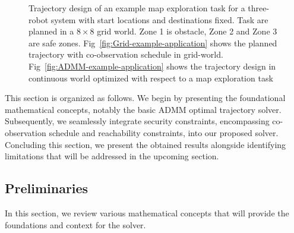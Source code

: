 \documentclass[journal]{IEEEtran}  %
\begin{document}
\begin{figure}
     \centering
     \caption{Trajectory design of an example map exploration task for a three-robot system with start locations and destinations fixed. Task are planned in a $8 \times 8$ grid world. Zone 1 is obstacle, Zone 2 and Zone 3 are safe zones. Fig~\ref{fig:Grid-example-application} shows the planned trajectory with co-observation schedule in grid-world. Fig~\ref{fig:ADMM-example-application} shows the trajectory design in continuous world optimized with respect to a map exploration task}
     \label{fig:example-application}
 \end{figure}
 
 This section is organized as follows. We begin by presenting the foundational mathematical concepts, notably the basic ADMM optimal trajectory solver. Subsequently, we seamlessly integrate security constraints, encompassing co-observation schedule and reachability constraints, into our proposed solver. Concluding this section, we present the obtained results alongside identifying limitations that will be addressed in the upcoming section.

\subsection{Preliminaries}
In this section, we review various mathematical concepts that will provide the foundations and context for the solver.
\end{document}

